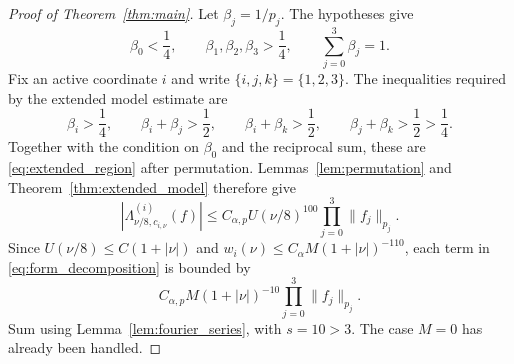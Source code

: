 \documentclass[12pt,reqno]{amsart}
\theoremstyle{plain}
\theoremstyle{definition}
\theoremstyle{remark}
\numberwithin{equation}{section}
\begin{document}
\begin{proof}[Proof of Theorem~\ref{thm:main}]
Let $\beta_j=1/p_j$. The hypotheses give
\[
 \beta_0<\frac14,\qquad
 \beta_1,\beta_2,\beta_3>\frac14,\qquad
 \sum_{j=0}^3\beta_j=1.
\]
Fix an active coordinate $i$ and write $\{i,j,k\}=\{1,2,3\}$.
The inequalities required by the extended model estimate are
\[
 \beta_i>\frac14,\qquad
 \beta_i+\beta_j>\frac12,\qquad
 \beta_i+\beta_k>\frac12,\qquad
 \beta_j+\beta_k>\frac12>\frac14.
\]
Together with the condition on $\beta_0$ and the reciprocal sum,
these are \eqref{eq:extended_region} after permutation.
Lemmas~\ref{lem:permutation} and Theorem~\ref{thm:extended_model}
therefore give
\[
 |\Lambda^{(i)}_{\nu/8,c_{i,\nu}}(f)|
       \le C_{\alpha,p}U(\nu/8)^{100}\prod_{j=0}^3\|f_j\|_{p_j}.
\]
Since $U(\nu/8)\le C(1+|\nu|)$ and
$w_i(\nu)\le C_\alpha M(1+|\nu|)^{-110}$, each term in
\eqref{eq:form_decomposition} is bounded by
\[
 C_{\alpha,p}M(1+|\nu|)^{-10}\prod_{j=0}^3\|f_j\|_{p_j}.
\]
Sum using Lemma~\ref{lem:fourier_series}, with $s=10>3$.
The case $M=0$ has already been handled.
\end{proof}
\end{document}
